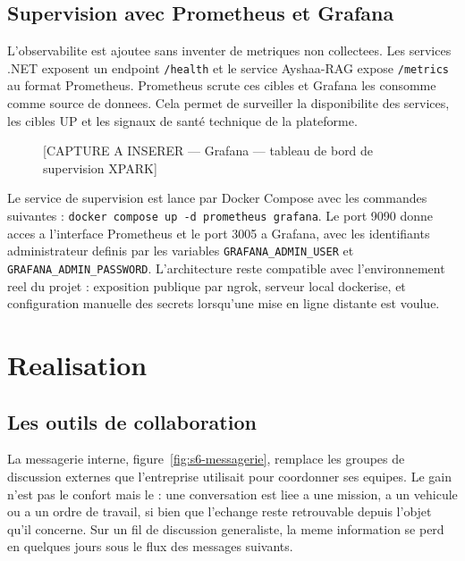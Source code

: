 \subsection{Supervision avec Prometheus et Grafana}

L'observabilite est ajoutee sans inventer de metriques non collectees.
Les services .NET exposent un endpoint \texttt{/health} et le service
Ayshaa-RAG expose \texttt{/metrics} au format Prometheus. Prometheus
scrute ces cibles et Grafana les consomme comme source de donnees. Cela
permet de surveiller la disponibilite des services, les cibles UP et les
signaux de sant\'e technique de la plateforme.

\begin{figure}[H]
\centering
\caption{[CAPTURE A INSERER — Grafana — tableau de bord de supervision XPARK]}
\label{fig:grafana-dashboard}
\end{figure}

Le service de supervision est lance par Docker Compose avec les commandes
suivantes : \texttt{docker compose up -d prometheus grafana}. Le port
9090 donne acces a l'interface Prometheus et le port 3005 a Grafana,
avec les identifiants administrateur definis par les variables
\texttt{GRAFANA\_ADMIN\_USER} et \texttt{GRAFANA\_ADMIN\_PASSWORD}.
L'architecture reste compatible avec l'environnement reel du projet :
exposition publique par ngrok, serveur local dockerise, et configuration
manuelle des secrets lorsqu'une mise en ligne distante est voulue.

\section{Realisation}

\subsection{Les outils de collaboration}

La messagerie interne, figure~\ref{fig:s6-messagerie}, remplace les
groupes de discussion externes que l'entreprise utilisait pour coordonner
ses equipes. Le gain n'est pas le confort mais le  : une conversation est liee a une mission, a un
vehicule ou a un ordre de travail, si bien que l'echange reste retrouvable
depuis l'objet qu'il concerne. Sur un fil de discussion generaliste, la
meme information se perd en quelques jours sous le flux des messages
suivants.

